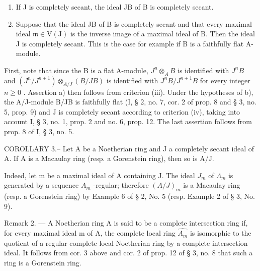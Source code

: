 \begin{enumerate}
\def\labelenumi{\alph{enumi})}
\item
  If J is completely secant, the ideal JB of B is completely secant.
\item
  Suppose that the ideal JB of B is completely secant and that every maximal ideal \(\mathfrak{m} \in \mathrm{V}(\mathrm{J})\) is the inverse image of a maximal ideal of B. Then the ideal J is completely secant. This is the case for example if B is a faithfully flat A-module.
\end{enumerate}

First, note that since the B is a flat A-module, \(J^n \otimes_A B\) is identified with \(J^n B\) and \((J^n / J^{n+1}) \otimes_{A/J} (B/JB)\) is identified with \(J^n B / J^{n+1} B\) for every integer \(n \geqslant 0\) . Assertion a) then follows from criterion (iii). Under the hypotheses of b), the A/J-module B/JB is faithfully flat (I, § 2, no. 7, cor. 2 of prop. 8 and § 3, no. 5, prop. 9) and J is completely secant according to criterion (iv), taking into account I, § 3, no. 1, prop. 2 and no. 6, prop. 12. The last assertion follows from prop. 8 of I, § 3, no. 5.

COROLLARY 3.-- Let A be a Noetherian ring and J a completely secant ideal of A. If A is a Macaulay ring (resp. a Gorenstein ring), then so is A/J.

Indeed, let m be a maximal ideal of A containing J. The ideal \(J_{m}\) of \(\Lambda_{m}\) is generated by a sequence \(A_{m}\) -regular; therefore \((A/J)_{m}\) is a Macaulay ring (resp. a Gorenstein ring) by Example 6 of § 2, No. 5 (resp. Example 2 of § 3, No. 9).

Remark 2. — A Noetherian ring A is said to be a complete intersection ring if, for every maximal ideal m of A, the complete local ring \(\widehat{A_{m}}\) is isomorphic to the quotient of a regular complete local Noetherian ring by a complete intersection ideal. It follows from cor. 3 above and cor. 2 of prop. 12 of § 3, no. 8 that such a ring is a Gorenstein ring.

